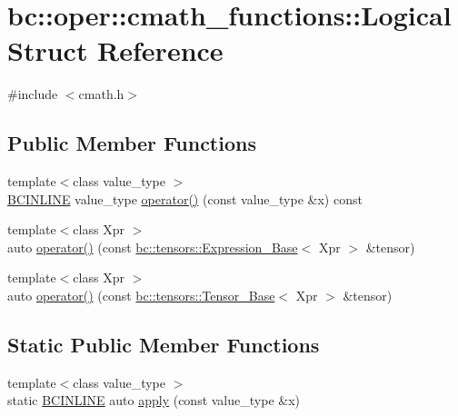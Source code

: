 \hypertarget{structbc_1_1oper_1_1cmath__functions_1_1Logical}{}\section{bc\+:\+:oper\+:\+:cmath\+\_\+functions\+:\+:Logical Struct Reference}
\label{structbc_1_1oper_1_1cmath__functions_1_1Logical}


{\ttfamily \#include $<$cmath.\+h$>$}

\subsection*{Public Member Functions}
\begin{DoxyCompactItemize}
\item 
{\footnotesize template$<$class value\+\_\+type $>$ }\\\hyperlink{common_8h_a6699e8b0449da5c0fafb878e59c1d4b1}{B\+C\+I\+N\+L\+I\+NE} value\+\_\+type \hyperlink{structbc_1_1oper_1_1cmath__functions_1_1Logical_ab854d797bd109844cc9ba7d3ce1cfcee}{operator()} (const value\+\_\+type \&x) const
\item 
{\footnotesize template$<$class Xpr $>$ }\\auto \hyperlink{structbc_1_1oper_1_1cmath__functions_1_1Logical_afb666a2d7b3a78aca88015d8c4411729}{operator()} (const \hyperlink{classbc_1_1tensors_1_1Expression__Base}{bc\+::tensors\+::\+Expression\+\_\+\+Base}$<$ Xpr $>$ \&tensor)
\item 
{\footnotesize template$<$class Xpr $>$ }\\auto \hyperlink{structbc_1_1oper_1_1cmath__functions_1_1Logical_afae5f8a5c6a0f87edef4555448e672b0}{operator()} (const \hyperlink{classbc_1_1tensors_1_1Tensor__Base}{bc\+::tensors\+::\+Tensor\+\_\+\+Base}$<$ Xpr $>$ \&tensor)
\end{DoxyCompactItemize}
\subsection*{Static Public Member Functions}
\begin{DoxyCompactItemize}
\item 
{\footnotesize template$<$class value\+\_\+type $>$ }\\static \hyperlink{common_8h_a6699e8b0449da5c0fafb878e59c1d4b1}{B\+C\+I\+N\+L\+I\+NE} auto \hyperlink{structbc_1_1oper_1_1cmath__functions_1_1Logical_ac21786a26721129cf03c06dc5ec85543}{apply} (const value\+\_\+type \&x)
\end{DoxyCompactItemize}


